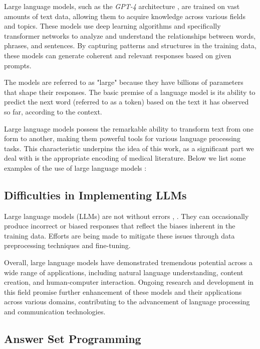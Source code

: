 \documentclass[10pt,leqno]{amsart}
\begin{document}
Large language models, such as the \textit{GPT-4} architecture \cite{openai2023gpt4}, are trained on vast amounts of text data, allowing them to acquire knowledge across various fields and topics. These models use deep learning algorithms \cite{Sarker2021} and specifically transformer networks \cite{Dosovitskiy2020} to analyze and understand the relationships between words, phrases, and sentences. By capturing patterns and structures in the training data, these models can generate coherent and relevant responses based on given prompts.

The models are referred to as "large" because they have billions of parameters that shape their responses. The basic premise of a language model is its ability to predict the next word (referred to as a token) based on the text it has observed so far, according to the context.

Large language models possess the remarkable ability to transform text from one form to another, making them powerful tools for various language processing tasks. This characteristic underpins the idea of this work, as a significant part we deal with is the appropriate encoding of medical literature. Below we list some examples of the use of large language models \cite{Paranjape2023}:

\subsection{Difficulties in Implementing LLMs}

Large language models (LLMs) are not without errors \cite{Raj2023}, \cite{Ruis2023}. They can occasionally produce incorrect or biased responses that reflect the biases inherent in the training data. Efforts are being made to mitigate these issues through data preprocessing techniques and fine-tuning.

Overall, large language models have demonstrated tremendous potential across a wide range of applications, including natural language understanding, content creation, and human-computer interaction. Ongoing research and development in this field promise further enhancement of these models and their applications across various domains, contributing to the advancement of language processing and communication technologies.

\subsection{Answer Set Programming}
\end{document}
